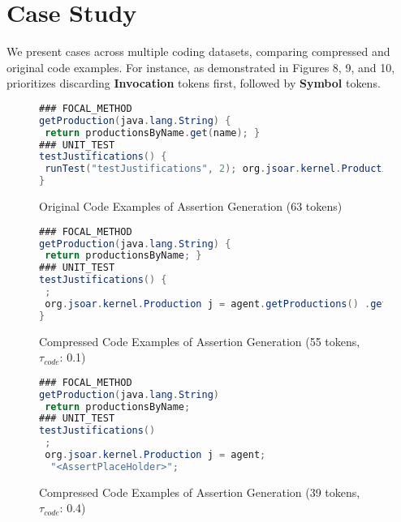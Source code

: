 \section{Case Study}\label{sec:appendix_casestudy}

We present cases across multiple coding datasets, comparing compressed and original code examples. For instance, as demonstrated in Figures 8, 9, and 10, \ourtool prioritizes discarding \textbf{Invocation} tokens first, followed by \textbf{Symbol} tokens.
\begin{figure}[!h]
\begin{tcolorbox}
\begin{lstlisting}[language=Java,frame=single,framerule=0pt]
### FOCAL_METHOD 
getProduction(java.lang.String) { 
 return productionsByName.get(name); }  
### UNIT_TEST  
testJustifications() { 
 runTest("testJustifications", 2); org.jsoar.kernel.Production j = agent.getProductions() .getProduction("justification-1"); "<AssertPlaceHolder>"; 
}    
\end{lstlisting}
\end{tcolorbox}
\caption{Original Code Examples of Assertion Generation (63 tokens)}
\label{fig:code-example}
\end{figure}

\begin{figure}[!h]
\begin{tcolorbox}
\begin{lstlisting}[language=Java,frame=single,framerule=0pt]
### FOCAL_METHOD 
getProduction(java.lang.String) { 
 return productionsByName; }  
### UNIT_TEST  
testJustifications() { 
 ; 
 org.jsoar.kernel.Production j = agent.getProductions() .getProduction("justification-1"); "<AssertPlaceHolder>"; 
}    
\end{lstlisting}
\end{tcolorbox}
\caption{Compressed Code Examples of Assertion Generation (55 tokens, $\tau_{code}$: 0.1)}
\label{fig:code-example}
\end{figure}

\begin{figure}[!h]
\begin{tcolorbox}
\begin{lstlisting}[language=Java,frame=single,framerule=0pt]
### FOCAL_METHOD 
getProduction(java.lang.String)  
 return productionsByName;     
### UNIT_TEST  
testJustifications()  
 ; 
 org.jsoar.kernel.Production j = agent;
  "<AssertPlaceHolder>"; 
\end{lstlisting}
\end{tcolorbox}
\caption{Compressed Code Examples of Assertion Generation (39 tokens, $\tau_{code}$: 0.4)}
\label{fig:code-example}
\end{figure}


